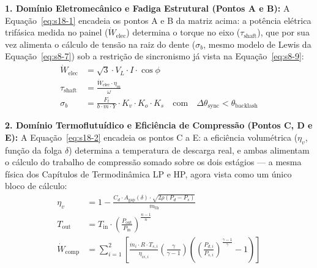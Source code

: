 \documentclass[12pt,a4paper]{article}
\numberwithin{equation}{section}
\numberwithin{table}{section}
\numberwithin{figure}{section}
\begin{document}
\textbf{1. Domínio Eletromecânico e Fadiga Estrutural (Pontos A e B):} A Equação~\eqref{eq:s18-1} encadeia os pontos A e B da matriz acima: a potência elétrica trifásica medida no painel ($\dot{W}_{\text{elec}}$) determina o torque no eixo ($\tau_{\text{shaft}}$), que por sua vez alimenta o cálculo de tensão na raiz do dente ($\sigma_b$, mesmo modelo de Lewis da Equação~\eqref{eq:s8-7}) sob a restrição de sincronismo já vista na Equação~\eqref{eq:s8-9}:
\begin{equation}\label{eq:s18-1}
\begin{aligned}
	\dot{W}_{\text{elec}} &= \sqrt{3} \cdotp V_L \cdotp I \cdotp \cos \phi \\[8pt]
	\tau_{\text{shaft}} &= \frac{\dot{W}_{\text{elec}} \cdotp \eta_m}{\omega} \\[8pt]
	\sigma_b &= \frac{F_t}{b \cdotp m \cdotp Y} \cdotp K_v \cdotp K_o \cdotp K_s \quad \text{com} \quad \Delta \theta_{\text{sync}} < \theta_{\text{backlash}}
\end{aligned}
\end{equation}

\textbf{2. Domínio Termoflutuídico e Eficiência de Compressão (Pontos C, D e E):} A Equação~\eqref{eq:s18-2} encadeia os pontos C a E: a eficiência volumétrica ($\eta_v$, função da folga $\delta$) determina a temperatura de descarga real, e ambas alimentam o cálculo do trabalho de compressão somado sobre os dois estágios — a mesma física dos Capítulos de Termodinâmica LP e HP, agora vista como um único bloco de cálculo:
\begin{equation}\label{eq:s18-2}
\begin{aligned}
	\eta_{v} &= 1 - \frac{C_d \cdotp A_{\text{gap}}(\delta) \cdotp \sqrt{2\rho (P_d - P_s)}}{\dot{m}_{\text{th}}} \\[8pt]
	T_{\text{out}} &= T_{\text{in}} \cdotp \left( \frac{P_{\text{out}}}{P_{\text{in}}} \right)^{\frac{n-1}{n}} \\[8pt]
	\dot{W}_{\text{comp}} &= \sum_{i=1}^{2} \left[ \frac{\dot{m}_i \cdotp R \cdotp T_{s,i}}{\eta_{is,i}} \left( \frac{\gamma}{\gamma - 1} \right) \left( \left( \frac{P_{d,i}}{P_{s,i}} \right)^{\frac{\gamma-1}{\gamma}} - 1 \right) \right]
\end{aligned}
\end{equation}
\end{document}
